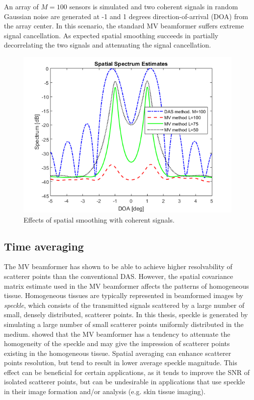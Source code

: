 \noindent
An array of $M=100$ sensors is simulated and two coherent signals in random Gaussian noise are generated at -1 and 1 degrees direction-of-arrival (DOA) from the array center. In this scenario, the standard MV beamformer suffers extreme signal cancellation. As expected spatial smoothing succeeds in partially decorrelating the two signals and attenuating the signal cancellation.

\begin{figure}[ht]
    \centering
    \includegraphics[width=\linewidth]{./images/background/spatial_averaging.png}
    \caption{Effects of spatial smoothing with coherent signals.}
    \label{fig:spatial_smoothing}
\end{figure}


\subsection{Time averaging}
\label{sec:time_averaging}
The MV beamformer has shown to be able to achieve higher resolvability of scatterer points than the conventional DAS. However, the spatial covariance matrix estimate used in the MV beamformer affects the patterns of homogeneous tissue. Homogeneous tissues are typically represented in beamformed images by \textit{speckle}, which consists of the transmitted signals scattered by a large number of small, densely distributed, scatterer points. In this thesis, speckle is generated by simulating a large number of small scatterer points uniformly distributed in the medium.
\cite{speckle} showed that the MV beamformer has a tendency to attenuate the homogeneity of the speckle and may give the impression of scatterer points existing in the homogeneous tissue.
Spatial averaging can enhance scatterer points resolution, but tend to result in lower average speckle magnitude. This effect can be beneficial for certain applications, as it tends to improve the SNR of isolated scatterer points, but can be undesirable in applications that use speckle in their image formation and/or analysis (e.g. skin tissue imaging).

